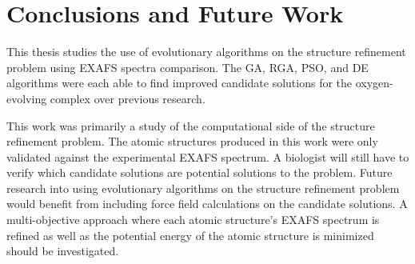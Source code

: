 \chapter{Conclusions and Future Work}

This thesis studies the use of evolutionary algorithms on the structure refinement problem using EXAFS spectra comparison. The GA, RGA, PSO, and DE algorithms were each able to find improved candidate solutions for the oxygen-evolving complex over previous research.


This work was primarily a study of the computational side of the structure refinement problem. The atomic structures produced in this work were only validated against the experimental EXAFS spectrum. A biologist will still have to verify which candidate solutions are potential solutions to the problem. Future research into using evolutionary algorithms on the structure refinement problem would benefit from including force field calculations on the candidate solutions. A multi-objective approach where each atomic structure's EXAFS spectrum is refined as well as the potential energy of the atomic structure is minimized should be investigated.
